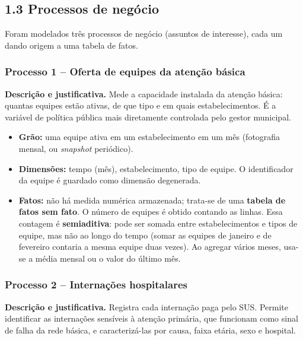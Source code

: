 \documentclass[12pt,a4paper]{article}
\begin{document}
\FloatBarrier\subsection*{1.3 Processos de negócio}

Foram modelados três processos de negócio (assuntos de interesse), cada um dando origem a uma tabela de fatos.


\subsubsection*{Processo 1 – Oferta de equipes da atenção básica}

\textbf{Descrição e justificativa.} Mede a capacidade instalada da atenção básica: quantas equipes estão ativas, de que tipo e em quais estabelecimentos. É a variável de política pública mais diretamente controlada pelo gestor municipal.


\begin{itemize}\item \textbf{Grão:} uma equipe ativa em um estabelecimento em um mês (fotografia mensal, ou \textit{snapshot} periódico).
\item \textbf{Dimensões:} tempo (mês), estabelecimento, tipo de equipe. O identificador da equipe é guardado como dimensão degenerada.
\item \textbf{Fatos:} não há medida numérica armazenada; trata-se de uma \textbf{tabela de fatos sem fato}. O número de equipes é obtido contando as linhas. Essa contagem é \textbf{semiaditiva}: pode ser somada entre estabelecimentos e tipos de equipe, mas não ao longo do tempo (somar as equipes de janeiro e de fevereiro contaria a mesma equipe duas vezes). Ao agregar vários meses, usa-se a média mensal ou o valor do último mês.\end{itemize}

\subsubsection*{Processo 2 – Internações hospitalares}

\textbf{Descrição e justificativa.} Registra cada internação paga pelo SUS. Permite identificar as internações sensíveis à atenção primária, que funcionam como sinal de falha da rede básica, e caracterizá-las por causa, faixa etária, sexo e hospital.
\end{document}
